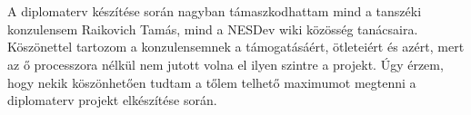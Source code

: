 \chapter*{\koszonetnyilvanitas}

A diplomaterv készítése során nagyban támaszkodhattam mind a tanszéki konzulensem Raikovich  Tamás, mind a NESDev wiki közösség tanácsaira. Köszönettel tartozom a konzulensemnek a támogatásáért, ötleteiért és azért, mert az ő processzora nélkül nem jutott volna el ilyen szintre a projekt. Úgy érzem, hogy nekik köszönhetően tudtam a tőlem telhető maximumot megtenni a diplomaterv projekt elkészítése során.